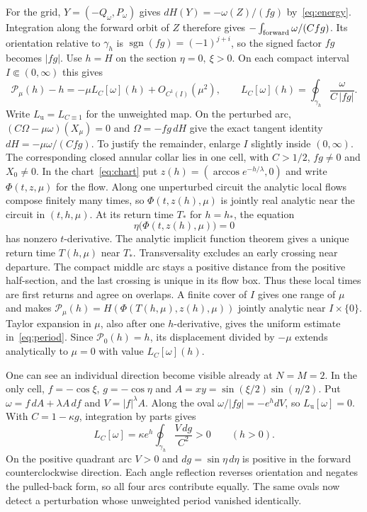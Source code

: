 \documentclass[11pt,a4paper]{amsart}
\numberwithin{equation}{section}
\newcommand{\Lu}{L_{\mathrm u}}
\newcommand{\sgn}{\operatorname{sgn}}
\begin{document}
For the grid, \(Y=(-Q_\omega,P_\omega)\) gives \(dH(Y)=-\omega(Z)/(fg)\) by~\eqref{eq:energy}. Integration along the forward orbit of \(Z\) therefore gives \(-\int_{\rm forward}\omega/(C f g)\). Its orientation relative to \(\gamma_h\) is \(\sgn(fg)=(-1)^{j+i}\), so the signed factor \(fg\) becomes \(|fg|\). Use \(h=H\) on the section \(\eta=0,\ \xi>0\). On each compact interval \(I\Subset(0,\infty)\) this gives
\begin{equation}\label{eq:period}
 \mathcal P_\mu(h)-h=-\mu L_C[\omega](h)+O_{C^1(I)}(\mu^2),\qquad
 L_C[\omega](h)=\oint_{\gamma_h}\frac{\omega}{C\,|fg|}.
\end{equation}
Write \(\Lu=L_{C\equiv1}\) for the unweighted map. On the perturbed arc, \((C\Omega-\mu\omega)(X_\mu)=0\) and \(\Omega=-fg\,dH\) give the exact tangent identity \(dH=-\mu\omega/(C f g)\). To justify the remainder, enlarge \(I\) slightly inside \((0,\infty)\). The corresponding closed annular collar lies in one cell, with \(C>1/2\), \(fg\ne0\) and \(X_0\ne0\). In the chart~\eqref{eq:chart} put \(z(h)=(\arccos e^{-h/\lambda},0)\) and write \(\Phi(t,z,\mu)\) for the flow. Along one unperturbed circuit the analytic local flows compose finitely many times, so \(\Phi(t,z(h),\mu)\) is jointly real analytic near the circuit in \((t,h,\mu)\). At its return time \(T_*\) for \(h=h_*\), the equation
\[
 \eta\bigl(\Phi(t,z(h),\mu)\bigr)=0
\]
has nonzero \(t\)-derivative. The analytic implicit function theorem gives a unique return time \(T(h,\mu)\) near \(T_*\). Transversality excludes an early crossing near departure. The compact middle arc stays a positive distance from the positive half-section, and the last crossing is unique in its flow box. Thus these local times are first returns and agree on overlaps. A finite cover of \(I\) gives one range of \(\mu\) and makes \(\mathcal P_\mu(h)=H(\Phi(T(h,\mu),z(h),\mu))\) jointly analytic near \(I\times\{0\}\). Taylor expansion in \(\mu\), also after one \(h\)-derivative, gives the uniform estimate in~\eqref{eq:period}. Since \(\mathcal P_0(h)=h\), its displacement divided by \(-\mu\) extends analytically to \(\mu=0\) with value \(L_C[\omega](h)\).

One can see an individual direction become visible already at $N=M=2$. In the only cell, $f=-\cos\xi$, $g=-\cos\eta$ and $A=xy=\sin(\xi/2)\sin(\eta/2)$. Put $\omega=f\,dA+\lambda A\,df$ and $V=|f|^\lambda A$. Along the oval $\omega/|fg|=-e^h dV$, so $\Lu[\omega]=0$. With $C=1-\kappa g$, integration by parts gives
\begin{equation}\label{eq:visible}
 L_C[\omega]=\kappa e^h\oint_{\gamma_h}\frac{V\,dg}{C^2}>0\qquad (h>0).
\end{equation}
On the positive quadrant arc $V>0$ and $dg=\sin\eta\,d\eta$ is positive in the forward counterclockwise direction. Each angle reflection reverses orientation and negates the pulled-back form, so all four arcs contribute equally. The same ovals now detect a perturbation whose unweighted period vanished identically.
\end{document}
